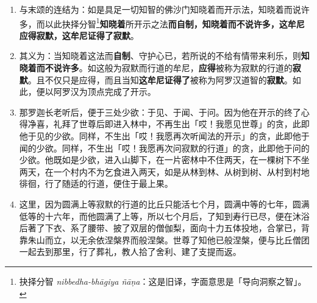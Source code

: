 \begin{enumerate}\item 与末颂的连结为：如是具足一切知智的佛沙门知晓着而开示法，知晓着而说许多，而以此抉择分智\footnote{抉择分智 \textit{nibbedha-bhāgiya ñāṇa}：这是旧译，字面意思是「导向洞察之智」。}\textbf{知晓着}所开示之法\textbf{而自制，知晓着而不说许多，这牟尼应得寂默，这牟尼证得了寂默}。
\item 其义为：当知晓着这法而\textbf{自制}、守护心已，若所说的不给有情带来利乐，则\textbf{知晓着而不说许多}。如这般为寂默而行道的牟尼，\textbf{应得}被称为寂默的行道的\textbf{寂默}。且不仅只是应得，而且当知\textbf{这牟尼证得了}被称为阿罗汉道智的\textbf{寂默}。如此，便以阿罗汉为顶点完成了开示。
\item 那罗迦长老听后，便于三处少欲：于见、于闻、于问。因为他在开示的终了心得净喜，礼拜了世尊后即进入林中，不再生出「哎！我愿见世尊」的贪，此即他于见的少欲。同样，不生出「哎！我愿再次听闻法的开示」的贪，此即他于闻的少欲。同样，不生出「哎！我愿再次问寂默的行道」的贪，此即他于问的少欲。他既如是少欲，进入山脚下，在一片密林中不住两天，在一棵树下不坐两天，在一个村内不为乞食进入两天，如是从林到林、从树到树、从村到村地徘徊，行了随适的行道，便住于最上果。
\item 这里，因为圆满上等寂默的行道的比丘只能活七个月，圆满中等的七年，圆满低等的十六年，而他圆满了上等，所以七个月后，了知到寿行已尽，便在沐浴后著了下衣、系了腰带、披了双层的僧伽梨，面向十力五体投地，合掌已，背靠朱山而立，以无余依涅槃界而般涅槃。世尊了知他已般涅槃，便与比丘僧团一起去到那里，行了葬礼，教人拾了舍利、建了支提而返。\end{enumerate}

